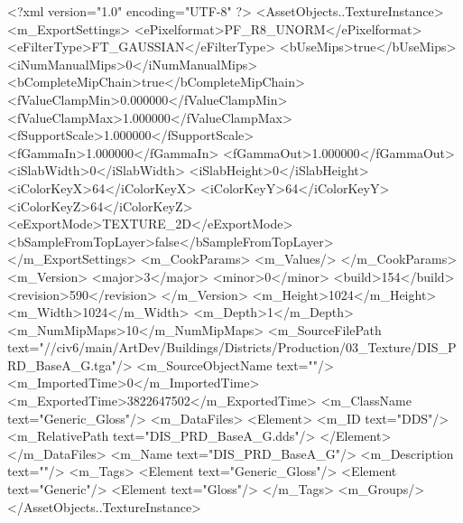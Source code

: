 <?xml version="1.0" encoding="UTF-8" ?>
<AssetObjects..TextureInstance>
	<m_ExportSettings>
		<ePixelformat>PF_R8_UNORM</ePixelformat>
		<eFilterType>FT_GAUSSIAN</eFilterType>
		<bUseMips>true</bUseMips>
		<iNumManualMips>0</iNumManualMips>
		<bCompleteMipChain>true</bCompleteMipChain>
		<fValueClampMin>0.000000</fValueClampMin>
		<fValueClampMax>1.000000</fValueClampMax>
		<fSupportScale>1.000000</fSupportScale>
		<fGammaIn>1.000000</fGammaIn>
		<fGammaOut>1.000000</fGammaOut>
		<iSlabWidth>0</iSlabWidth>
		<iSlabHeight>0</iSlabHeight>
		<iColorKeyX>64</iColorKeyX>
		<iColorKeyY>64</iColorKeyY>
		<iColorKeyZ>64</iColorKeyZ>
		<eExportMode>TEXTURE_2D</eExportMode>
		<bSampleFromTopLayer>false</bSampleFromTopLayer>
	</m_ExportSettings>
	<m_CookParams>
		<m_Values/>
	</m_CookParams>
	<m_Version>
		<major>3</major>
		<minor>0</minor>
		<build>154</build>
		<revision>590</revision>
	</m_Version>
	<m_Height>1024</m_Height>
	<m_Width>1024</m_Width>
	<m_Depth>1</m_Depth>
	<m_NumMipMaps>10</m_NumMipMaps>
	<m_SourceFilePath text="//civ6/main/ArtDev/Buildings/Districts/Production/03_Texture/DIS_PRD_BaseA_G.tga"/>
	<m_SourceObjectName text=""/>
	<m_ImportedTime>0</m_ImportedTime>
	<m_ExportedTime>3822647502</m_ExportedTime>
	<m_ClassName text="Generic_Gloss"/>
	<m_DataFiles>
		<Element>
			<m_ID text="DDS"/>
			<m_RelativePath text="DIS_PRD_BaseA_G.dds"/>
		</Element>
	</m_DataFiles>
	<m_Name text="DIS_PRD_BaseA_G"/>
	<m_Description text=""/>
	<m_Tags>
		<Element text="Generic_Gloss"/>
		<Element text="Generic"/>
		<Element text="Gloss"/>
	</m_Tags>
	<m_Groups/>
</AssetObjects..TextureInstance>

